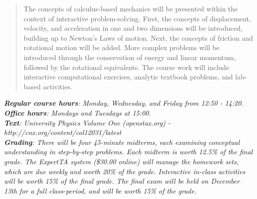 \documentclass[10pt]{article}
\begin{document}
\maketitle

\begin{abstract}
The concepts of calculus-based mechanics will be presented within the context of interactive problem-solving.  First, the concepts of displacement, velocity, and acceleration in one and two dimensions will be introduced, building up to Newton's Laws of motion.  Next, the concepts of friction and rotational motion will be added.  More complex problems will be introduced through the conservation of energy and linear momentum, followed by the rotational equivalents.  The course work will include interactive computational exercises, analytic textbook problems, and lab-based activities.
\end{abstract}
\noindent
\textit{\textbf{Regular course hours}: Monday, Wednesday, and Friday from 12:50 - 14:20.} \\
\textit{\textbf{Office hours}: Mondays and Tuesdays at 15:00.} \\
\textit{\textbf{Text}: University Physics Volume One (openstax.org) -  http://cnx.org/content/col12031/latest} \\
\textit{\textbf{Grading}: There will be four 45-minute midterms, each examining conceptual understanding in step-by-step problems.  Each midterm is worth 12.5\% of the final grade.  The ExpertTA system (\$30.00 online) will manage the homework sets, which are due weekly and worth 20\% of the grade.  Interactive in-class activities will be worth 15\% of the final grade.  The final exam will be held on December 13th for a full class-period, and will be worth 15\% of the grade.}
\end{document}
